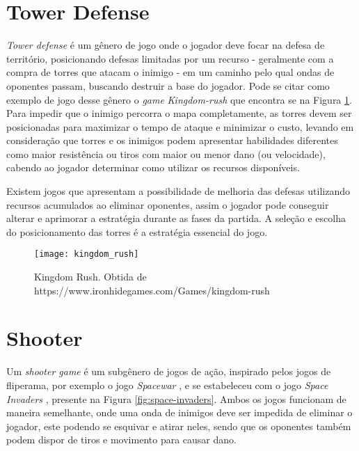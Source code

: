 \pagebreak

\section{Tower Defense}
\label{sec:jogo-td}

 \textit{Tower defense} é um gênero de jogo onde o jogador deve focar na defesa de território, posicionando defesas limitadas por um recurso - geralmente com a compra de torres que atacam o inimigo - em um caminho pelo qual ondas de oponentes passam, buscando destruir a base do jogador. Pode se citar como exemplo de jogo desse gênero o \textit{game} \textit{Kingdom-rush} \citep{kingdom_rush} que encontra se na Figura \ref{fig:kingdom-rush}. Para impedir que o inimigo percorra o mapa completamente, as torres devem ser posicionadas para maximizar o tempo de ataque e minimizar o custo, levando em consideração que torres e os inimigos podem apresentar habilidades diferentes como maior resistência ou tiros com maior ou menor dano (ou velocidade), cabendo ao jogador determinar como utilizar os recursos disponíveis.
 
Existem jogos que apresentam a possibilidade de melhoria das defesas utilizando recursos acumulados ao eliminar oponentes, assim o jogador pode conseguir alterar e aprimorar a estratégia durante as fases da partida. A seleção e escolha do posicionamento das torres é a estratégia essencial do jogo.

\begin{figure}
  \centering
  \texttt{[image: kingdom\_rush]}
  \caption{Kingdom Rush. Obtida de https://www.ironhidegames.com/Games/kingdom-rush\label{fig:kingdom-rush}}
\end{figure}

\pagebreak

\section{Shooter}
\label{sec:jogo-ss}

Um \textit{shooter game} é um subgênero de jogos de ação, inspirado pelos jogos de fliperama, por exemplo o jogo  \textit{Spacewar} \citep{Spacewar}, e se estabeleceu com o jogo \textit{Space Invaders} \citep{Space_Invaders}, presente na Figura \ref{fig:space-invaders}. Ambos os jogos funcionam de maneira semelhante, onde uma onda de inimigos deve ser impedida de eliminar o jogador, este podendo se esquivar e atirar neles, sendo que os oponentes também podem dispor de tiros e movimento para causar dano.

